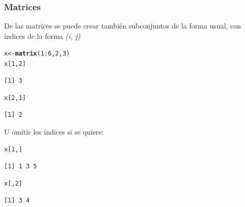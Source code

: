 \documentclass{article}\usepackage[]{graphicx}\usepackage[]{color}
\makeatletter
\newcommand{\hlnum}[1]{\textcolor[rgb]{0.686,0.059,0.569}{#1}}%
\newcommand{\hlopt}[1]{\textcolor[rgb]{0,0,0}{#1}}%
\newcommand{\hlstd}[1]{\textcolor[rgb]{0.345,0.345,0.345}{#1}}%
\newcommand{\hlkwb}[1]{\textcolor[rgb]{0.69,0.353,0.396}{#1}}%
\newcommand{\hlkwd}[1]{\textcolor[rgb]{0.737,0.353,0.396}{\textbf{#1}}}%
\newenvironment{kframe}{%
 \def\at@end@of@kframe{}%
 \ifinner\ifhmode%
  \def\at@end@of@kframe{\end{minipage}}%
  \begin{minipage}{\columnwidth}%
 \fi\fi%
 \def\FrameCommand##1{\hskip\@totalleftmargin \hskip-\fboxsep
 \colorbox{shadecolor}{##1}\hskip-\fboxsep
     \hskip-\linewidth \hskip-\@totalleftmargin \hskip\columnwidth}%
 \MakeFramed {\advance\hsize-\width
   \@totalleftmargin\z@ \linewidth\hsize
   \@setminipage}}%
 {\par\unskip\endMakeFramed%
 \at@end@of@kframe}
\newenvironment{knitrout}{}{} %
\makeatother
\begin{document}
    \subsubsection{Matrices}
    De las matrices se puede crear también subconjuntos de la forma usual, con índices de la forma \textit{(i, j)}
\begin{knitrout}
\color{fgcolor}\begin{kframe}
\begin{alltt}
  \hlstd{x} \hlkwb{<-} \hlkwd{matrix}\hlstd{(}\hlnum{1}\hlopt{:}\hlnum{6}\hlstd{,} \hlnum{2}\hlstd{,} \hlnum{3}\hlstd{)}
  \hlstd{x[}\hlnum{1}\hlstd{,} \hlnum{2}\hlstd{]}
\end{alltt}
\begin{verbatim}
[1] 3
\end{verbatim}
\begin{alltt}
  \hlstd{x[}\hlnum{2}\hlstd{,}\hlnum{1}\hlstd{]}
\end{alltt}
\begin{verbatim}
[1] 2
\end{verbatim}
\end{kframe}
\end{knitrout}
  
    U omitir los índices si se quiere:
\begin{knitrout}
\color{fgcolor}\begin{kframe}
\begin{alltt}
  \hlstd{x[}\hlnum{1}\hlstd{, ]}
\end{alltt}
\begin{verbatim}
[1] 1 3 5
\end{verbatim}
\begin{alltt}
  \hlstd{x[ ,}\hlnum{2}\hlstd{]}
\end{alltt}
\begin{verbatim}
[1] 3 4
\end{verbatim}
\end{kframe}
\end{knitrout}
\end{document}
